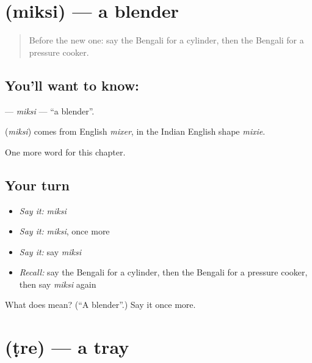 \section[\texorpdfstring{\bn{মিক্সি} (miksi)}{মিক্সি (miksi)}]{ (miksi) — a blender}

\label{lesson:BN-C206-miksi}



\begin{quote}
Before the new one: say the Bengali for a cylinder, then the Bengali for a pressure cooker.
\end{quote}

\subsection*{You'll want to know: }
\textbf{} — \emph{miksi} — \textquotedblleft{}a blender\textquotedblright{}.

\begin{cousinweb}
\textbf{} (\emph{miksi}) comes from English \emph{mixer}, in the Indian English shape \emph{mixie}.
\end{cousinweb}

\begin{grammarlens}[title={What you've built}]
One more word for this chapter.
\end{grammarlens}

\subsection*{Your turn}
\begin{itemize}
\raggedright
  \item \emph{Say it:} \emph{miksi}
  \item \emph{Say it:} \emph{miksi}, once more
  \item \emph{Say it:} say \emph{miksi}
  \item \emph{Recall:} say the Bengali for a cylinder, then the Bengali for a pressure cooker, then say \emph{miksi} again
\end{itemize}

\begin{tcolorbox}[breakable,colback=teal!4,colframe=teal!35!black,title={Before you move on}]
What does  mean? (\textquotedblleft{}A blender\textquotedblright{}.) Say it once more.
\end{tcolorbox}
\section[\texorpdfstring{\bn{ট্রে} (ṭre)}{ট্রে (ṭre)}]{ (ṭre) — a tray}

